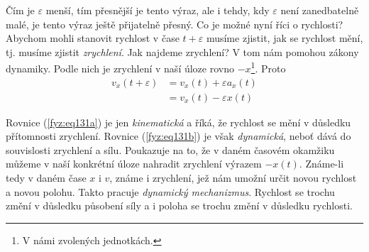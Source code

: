     Čím je \(\varepsilon\) menší, tím přesnější je tento výraz, ale i tehdy, kdy \(\varepsilon\) 
    není zanedbatelně malé, je tento výraz ještě přijatelně přesný. Co je možné nyní říci o 
    rychlosti? Abychom mohli stanovit rychlost v čase \(t + \varepsilon\) musíme zjistit, jak se 
    rychlost mění, tj. musíme zjistit \emph{zrychlení}. Jak najdeme zrychlení? V tom nám pomohou 
    zákony dynamiky. Podle nich je zrychlení v naší úloze rovno \(-x\)\footnote{V námi zvolených 
    jednotkách.}. Proto
    \begin{subequations}
      \label{fyz:eq131} 
      \begin{align}
        v_x(t+\varepsilon) &= v_x(t) + \varepsilon a_x(t)  \label{fyz:eq131a}        \\
                           &= v_x(t) - \varepsilon x(t)    \label{fyz:eq131b}
      \end{align}
    \end{subequations} 
    
    Rovnice (\ref{fyz:eq131a}) je jen \emph{kinematická} a říká, že rychlost se mění v důsledku 
    přítomnosti zrychlení. Rovnice (\ref{fyz:eq131b}) je však \emph{dynamická}, neboť dává do 
    souvislosti zrychlení a sílu. Poukazuje na to, že v daném časovém okamžiku můžeme v naší 
    konkrétní úloze nahradit zrychlení výrazem \(-x(t)\). Známe-li tedy v daném čase \(x\) i \(v\), 
    známe i zrychlení, jež nám umožní určit novou rychlost a novou polohu. Takto pracuje 
    \emph{dynamický mechanizmus}. Rychlost se trochu změní v důsledku působení síly a i poloha se 
    trochu změní v důsledku rychlosti.
     
